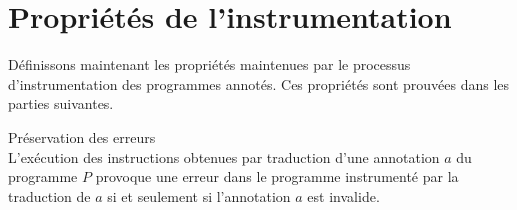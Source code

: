 







\section{Propriétés de l'instrumentation}
\label{sec:properties}


Définissons maintenant les propriétés maintenues par le processus
d'instrumentation des programmes annotés.
Ces propriétés sont prouvées dans les parties suivantes.


\begin{theorem}{Préservation des erreurs}\label{th:error}~\\
  L'exécution des instructions obtenues par traduction d'une annotation $a$ du
  programme $P$ provoque une erreur dans le programme instrumenté par la
  traduction de $a$ si et seulement si l'annotation $a$ est invalide.
\end{theorem}

